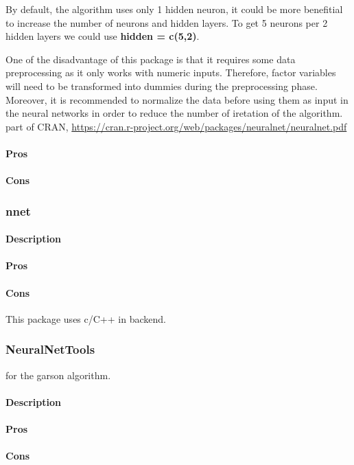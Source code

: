 \documentclass[6pt,letter]{article}\usepackage[]{graphicx}\usepackage[]{color}
\begin{document}
By default, the algorithm uses only 1 hidden neuron, it could be more benefitial to increase the number of neurons and hidden layers. To get 5 neurons per 2 hidden layers we could use \textbf{hidden = c(5,2)}.


One of the disadvantage of this package is that it requires some data preprocessing as it only works with numeric inputs. Therefore, factor variables will need to be transformed into dummies during the preprocessing phase. Moreover, it is recommended to normalize the data before using them as input in the neural networks in order to reduce the number of iretation of the algorithm.
part of CRAN, \url{https://cran.r-project.org/web/packages/neuralnet/neuralnet.pdf}
\paragraph{Pros}
\paragraph{Cons}
\subsubsection{nnet}
\paragraph{Description}
\paragraph{Pros}
\paragraph{Cons}
This package uses c/C++ in backend.

\subsubsection{NeuralNetTools}
for the garson algorithm.
\paragraph{Description}
\paragraph{Pros}
\paragraph{Cons}
\end{document}

